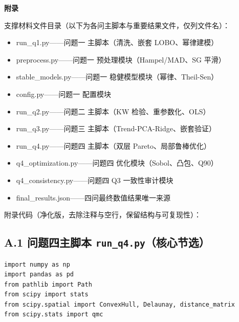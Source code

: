 \documentclass[12pt,a4paper]{article}
\newcommand{\appendixtitlefont}{\fontsize{14pt}{18pt}\selectfont\heiti\bfseries}
\begin{document}
\newpage
\label{appendix:start}
\begin{appendices}
\begin{center}
{\appendixtitlefont 附录}
\end{center}
\vspace{0.35em}

\par\noindent\hspace{2em}支撑材料文件目录（以下为各问主脚本与重要结果文件，仅列文件名）：

\begin{itemize}[label={},leftmargin=1.9em,itemsep=0.25em,topsep=0.25em]
    \item run\_q1.py——问题一 主脚本（清洗、嵌套 LOBO、幂律建模）
    \item preprocess.py——问题一 预处理模块（Hampel/MAD、SG 平滑）
    \item stable\_models.py——问题一 稳健模型模块（幂律、Theil-Sen）
    \item config.py——问题一 配置模块
    \item run\_q2.py——问题二 主脚本（KW 检验、重参数化、OLS）
    \item run\_q3.py——问题三 主脚本（Trend-PCA-Ridge、嵌套验证）
    \item run\_q4.py——问题四 主脚本（双层 Pareto、局部鲁棒优化）
    \item q4\_optimization.py——问题四 优化模块（Sobol、凸包、Q90）
    \item q4\_consistency.py——问题四 Q3 一致性审计模块
    \item final\_results.json——四问最终数值结果唯一来源
\end{itemize}

\vspace{0.6em}
\par\noindent\hspace{2em}附录代码（净化版，去除注释与空行，保留结构与可复现性）：

\subsection*{A.1 问题四主脚本 \texttt{run\_q4.py}（核心节选）}

\begin{lstlisting}[caption={问题四：双层策略优化核心逻辑},label={lst:q4}]
import numpy as np
import pandas as pd
from pathlib import Path
from scipy import stats
from scipy.spatial import ConvexHull, Delaunay, distance_matrix
from scipy.stats import qmc


\end{lstlisting}
\end{appendices}
\end{document}
